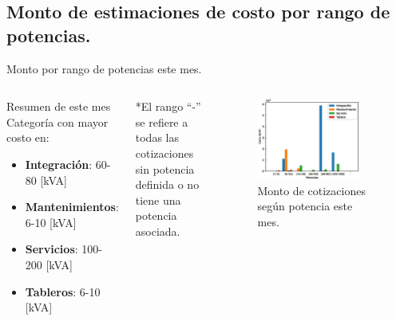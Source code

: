 \documentclass[aspectratio=169,xcolor=dvipsnames]{beamer}
\begin{document}
\subsection{Monto de estimaciones de costo por rango de potencias.}
\begin{frame}{Monto por rango de potencias este mes.}

\begin{columns}[c]
 \begin{block}{Resumen de este mes}
    Categoría con mayor costo en:
     \begin{itemize}
         \item \textbf{Integración}: 60-80 [kVA]
         \item \textbf{Mantenimientos}: 6-10 [kVA]
         \item \textbf{Servicios}: 100-200 [kVA]
         \item \textbf{Tableros}: 6-10 [kVA]
     \end{itemize}
\end{block}
\begin{block}{}
    \tiny{*El rango ``-'' se refiere a todas las cotizaciones sin potencia definida o no tiene una potencia asociada.}
\end{block} 

\begin{figure}
     \includegraphics[width=0.85\textwidth]{EPS/potencia_costo_mes.eps}
     \caption{Monto de cotizaciones según potencia este mes.}
     \label{graph:potencia_costo_mes}
\end{figure}
\end{columns}
    
\end{frame}
\end{document}
